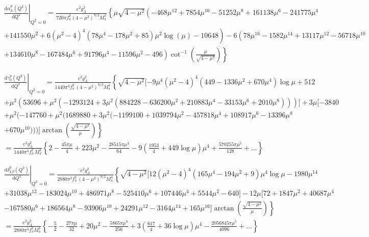 \documentclass[twocolumn,prc,showpacs,nofootinbib,preprintnumbers,amsmath,amssymb,superscriptaddress]{revtex4-1}
\def\dd{\mathrm{d}}
\begin{document}
\begin{widetext}
\begin{align}
&\left.\frac{\dd\alpha_{L}^p (Q^2)}{\dd Q^2}\right|_{Q^2=0}= \frac{e^2 g_A^2}{720 \pi f_\pi^2 (4-\mu^2)^{9/2} M_\pi^3}\left\{\mu  \sqrt{4-\mu ^2} \left(-468 \mu ^{12}+7854 \mu ^{10}-51252 \mu ^8+161138 \mu ^6-241775 \mu ^4 \right. \right. \nonumber\\
&\left. +141550 \mu ^2+6 \left(\mu ^2-4\right)^4
   \left(78 \mu ^4-178 \mu ^2+85\right) \mu ^2 \log (\mu )-10648\right)-6 \left(78 \mu ^{16}-1582 \mu ^{14}+13117 \mu ^{12}-56718 \mu
   ^{10} \right. \nonumber \\
 & \left. \left.+134610 \mu ^8-167484 \mu ^6+91796 \mu ^4-11596 \mu ^2-496\right) \cot ^{-1}\left(\frac{\mu }{\sqrt{4-\mu ^2}}\right)\right\}
\end{align}


\begin{align}
&\left.\frac{\dd \gamma_0^p (Q^2)}{\dd Q^2}\right|_{Q^2=0}=\frac{e^2 g_A^2}{1440 \pi^3 f_\pi^2\,  (4-\mu^2)^{9/2} M_\pi^4}\left\{  \sqrt{4-\mu^2}[-9\mu^4(\mu^2-4)^4 (449-1336\mu^2+670\mu^4)\log\mu+512 \right.\nonumber \\
&+\mu^2(53696+\mu^2(-1293124+3\mu^2 (884228-636200 \mu^2+210883\mu^4-33153\mu^6 +2010 \mu^8 )))] +3\mu [-3840 \nonumber \\
&+\mu^2 (-147760+\mu^2 (1689880+3\mu^2( -1199100+1039794\mu^2-457818\mu^4+108917 \mu^6-13396\mu^8 \nonumber \\ 
&\left.+670 \mu^{10}))) ]\arctan\left( \frac{\sqrt{4-\mu^2}}{\mu}\right)   \right\} \nonumber \\
&= \frac{e^2 g_A^2}{1440 \pi^3 f_\pi^2\, M_\pi^4} \left\{ 2 - \frac{45 \pi \mu}{4} + 223 \mu^2 - \frac{28515 \pi \mu^3 }{64} - 9 \left( \frac{1953}{4} + 449 \log\mu\right)\mu^4 + \frac{570255 \pi \mu^5}{128} + \dots   \right\} 
\end{align}


\begin{align}
&\left.\frac{\dd \delta_{LT}^p (Q^2)}{\dd Q^2}\right|_{Q^2=0}=\frac{e^2 g_A^2}{2880 \pi^3 f_\pi^2\,  (4-\mu^2)^{9/2} M_\pi^4}\left\{ \sqrt{4-\mu^2}[12 (\mu^2-4)^4 (165 \mu^4 -194 \mu^2 +9) \mu^4 \log\mu-1980 \mu^{14} \right.  \nonumber \\
&+31038 \mu^{12}-183024 \mu^{10} +486971 \mu^8 -525410 \mu^6 + 107446 \mu^4 +5544 \mu^2 -640] -12 \mu [72 + 1847 \mu^2 +40687 \mu^4 \nonumber \\
&\left. -167580 \mu^6+186564 \mu^8 -93906 \mu^{10} +24291 \mu^{12} -3164 \mu^{14}+165 \mu^{16}]\arctan\left( \frac{\sqrt{4-\mu^2}}{\mu} \right)   \right\} \nonumber \\
&= \frac{e^2 g_A^2}{2880 \pi^3 f_\pi^2 M_\pi^4} \left\{  -\frac{5}{2} - \frac{27 \pi \mu}{32} + 20 \mu^2 - \frac{5865 \pi \mu^3}{256} +  3\left( \frac{617}{4} + 36 \log\mu \right)\mu^4 - \frac{2056845 \pi \mu^5}{4096} +\dots \right\}
\end{align}



\end{widetext}
\end{document}

